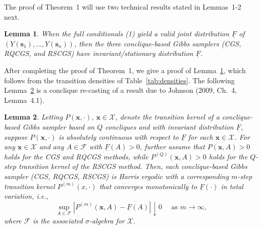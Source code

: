 \documentclass[12pt]{article}
\newtheorem{lemma}{Lemma}
\theoremstyle{definition}
\begin{document}
  The proof of Theorem~1 will use two technical results  stated in   Lemmas~1-2 next.

\begin{lemma}
\label{lemma:invariant}
When the full conditionals (1) yield a valid joint distribution $\underline{F}$ of $(Y(\boldsymbol s_1), \dots, Y(\boldsymbol s_n))$, then the three conclique-based Gibbs samplers (CGS, RQCGS, and RSCGS) have invariant/stationary distribution $\underline{F}$.
\end{lemma}
After completing the proof of Theorem~1, we give a proof of Lemma~\ref{lemma:invariant}, which follows from the
transition densities of Table~\ref{tab:densities}.  The following Lemma~\ref{lemma:harris}
is a conclique re-casting of a result due to Johnson (2009, Ch.~4, Lemma~4.1).
\begin{lemma}
\label{lemma:harris}
Letting $P(\boldsymbol x, \cdot) $, $\boldsymbol x \in\mathcal{X}$, denote the   transition kernel of a conclique-based Gibbs sampler based on $Q$ concliques and with invariant distribution $\underline{F}$,  suppose $P(\boldsymbol x, \cdot)$ is absolutely continuous with respect to $\underline{F}$
for each $\boldsymbol x \in\mathcal{X}$.  For any $\boldsymbol x \in\mathcal{X}$ and any $A\in\mathcal{F}$ with $\underline{F}(A)>0$, further
 assume that $P(\boldsymbol x, A)>0$ holds for the CGS and RQCGS methods, while $P^{(Q)}(\boldsymbol x, A)>0$ holds
for the $Q$-step transition kernel of the RSCGS method.  Then, each conclique-based Gibbs sampler (CGS, RQCGS, RSCGS) is Harris ergodic
 with a corresponding $m$-step transition kernel $P^{(m)}(x, \cdot)$ that converges monotonically to $\underline{F}(\cdot)$ in total variation, i.e.,
$$
\sup\limits_{A \in \mathcal{F}}|P^{(m)}(\boldsymbol x, A) - \underline{F}(A)|\downarrow 0 \quad\text{ as } m \rightarrow \infty,
$$
where $\mathcal{F}$ is the associated $\sigma$-algebra for $\mathcal{X}$.
\end{lemma}
\end{document}
